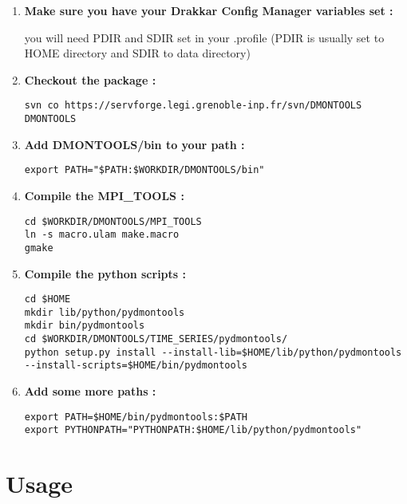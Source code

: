 \documentclass[a4paper,11pt]{article}
\begin{document}
\begin{enumerate}

\item \textbf{Make sure you have your Drakkar Config Manager variables set :}

you will need PDIR and SDIR set in your .profile (PDIR is usually set to HOME directory and
SDIR to data directory)

\item \textbf{Checkout the package :}

\begin{verbatim}
svn co https://servforge.legi.grenoble-inp.fr/svn/DMONTOOLS DMONTOOLS
\end{verbatim}

\item \textbf{Add DMONTOOLS/bin to your path :}

\begin{verbatim}
export PATH="$PATH:$WORKDIR/DMONTOOLS/bin"
\end{verbatim}

\item \textbf{Compile the MPI\_TOOLS :}

\begin{verbatim}
cd $WORKDIR/DMONTOOLS/MPI_TOOLS
ln -s macro.ulam make.macro
gmake
\end{verbatim}

\item \textbf{Compile the python scripts :}

\begin{verbatim}
cd $HOME
mkdir lib/python/pydmontools
mkdir bin/pydmontools
cd $WORKDIR/DMONTOOLS/TIME_SERIES/pydmontools/
python setup.py install --install-lib=$HOME/lib/python/pydmontools  
--install-scripts=$HOME/bin/pydmontools
\end{verbatim}

\item \textbf{Add some more paths :}

\begin{verbatim}
export PATH=$HOME/bin/pydmontools:$PATH
export PYTHONPATH="PYTHONPATH:$HOME/lib/python/pydmontools"
\end{verbatim}

\end{enumerate}

\clearpage
\newpage

\section{Usage}
\end{document}
